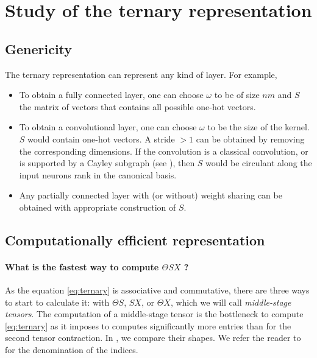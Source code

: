 \section{Study of the ternary representation}

\subsection{Genericity}

The ternary representation can represent any kind of layer. For example,
\begin{itemize}
\item To obtain a fully connected layer, one can choose $\omega$ to be of size $nm$ and $S$ the matrix of vectors that contains all possible one-hot vectors.
\item To obtain a convolutional layer, one can choose $\omega$ to be the size of the kernel. $S$ would contain one-hot vectors. A stride $> 1$ can be obtained by removing the corresponding dimensions. If the convolution is a classical convolution, or is supported by a Cayley subgraph (see ), then $S$ would be circulant along the input neurons rank in the canonical basis.
\item Any partially connected layer with (or without) weight sharing can be obtained with appropriate construction of $S$.
\end{itemize}

\subsection{Computationally efficient representation}

\paragraph{What is the fastest way to compute $\Theta S X$ ?}
As the equation \eqref{eq:ternary} is associative and commutative, there are three ways to start to calculate it: with $\Theta S$, $SX$, or $\Theta X$, which we will call \emph{middle-stage tensors}. The computation of a middle-stage tensor is the bottleneck to compute \eqref{eq:ternary} as it imposes to computes significantly more entries than for the second tensor contraction. In , we compare their shapes. We refer the reader to  for the denomination of the indices.

